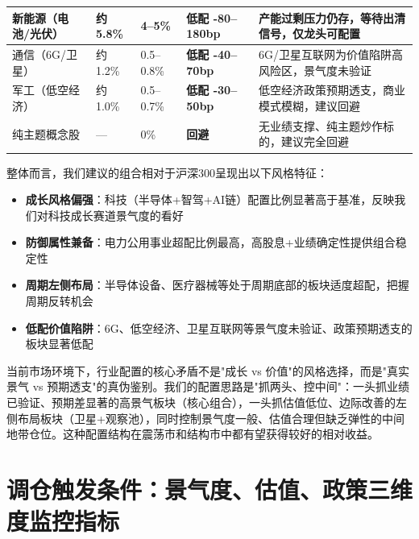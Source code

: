 \begin{exhibitbox}
\begin{tabularx}{\linewidth}{L{3.2cm} R{1.5cm} R{1.7cm} C{3.0cm} X}
新能源（电池/光伏） & 约5.8\% & 4--5\% & \textcolor{steelgrey}{低配 -80--180bp} & 产能过剩压力仍存，等待出清信号，仅龙头可配置 \\
\midrule
{}
通信（6G/卫星） & 约1.2\% & 0.5--0.8\% & \textcolor{riskred}{\textbf{低配 -40--70bp}} & 6G/卫星互联网为价值陷阱高风险区，景气度未验证 \\
军工（低空经济） & 约1.0\% & 0.5--0.7\% & \textcolor{riskred}{\textbf{低配 -30--50bp}} & 低空经济政策预期透支，商业模式模糊，建议回避 \\
纯主题概念股 & — & 0\% & \textcolor{riskred}{\textbf{回避}} & 无业绩支撑、纯主题炒作标的，建议完全回避 \\
\bottomrule
\end{tabularx}
\end{exhibitbox}

整体而言，我们建议的组合相对于沪深300呈现出以下风格特征：

\vspace{0.2em}
\begin{itemize}[leftmargin=2em]
\item \textbf{成长风格偏强}：科技（半导体+智驾+AI链）配置比例显著高于基准，反映我们对科技成长赛道景气度的看好
\item \textbf{防御属性兼备}：电力公用事业超配比例最高，高股息+业绩确定性提供组合稳定性
\item \textbf{周期左侧布局}：半导体设备、医疗器械等处于周期底部的板块适度超配，把握周期反转机会
\item \textbf{低配价值陷阱}：6G、低空经济、卫星互联网等景气度未验证、政策预期透支的板块显著低配
\end{itemize}

\begin{keyinsight}[行业配置的核心思路]
当前市场环境下，行业配置的核心矛盾不是"成长 vs 价值"的风格选择，而是"真实景气 vs 预期透支"的真伪鉴别。我们的配置思路是"抓两头、控中间"：一头抓业绩已验证、预期差显著的高景气板块（核心组合），一头抓估值低位、边际改善的左侧布局板块（卫星+观察池），同时控制景气度一般、估值合理但缺乏弹性的中间地带仓位。这种配置结构在震荡市和结构市中都有望获得较好的相对收益。
\end{keyinsight}

\section{调仓触发条件：景气度、估值、政策三维度监控指标}

